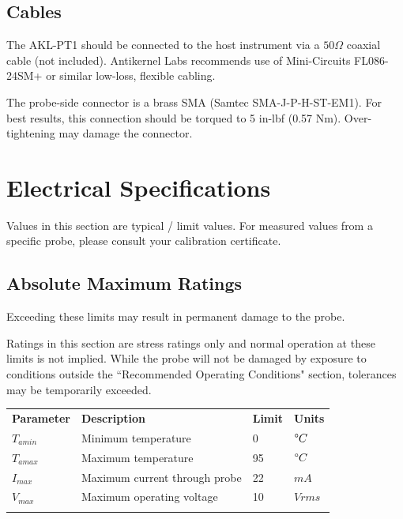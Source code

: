 \documentclass[11pt]{article}
\newcommand{\thinhline}{\Xhline{1\arrayrulewidth}}
\newcommand{\thickhline}{\Xhline{2.5\arrayrulewidth}}
\begin{document}
\subsection{Cables}

The AKL-PT1 should be connected to the host instrument via a $50 \Omega$ coaxial cable (not included). Antikernel Labs
recommends use of Mini-Circuits FL086-24SM+ or similar low-loss, flexible cabling.

The probe-side connector is a brass SMA (Samtec SMA-J-P-H-ST-EM1). For best results, this connection should be torqued
to 5 in-lbf (0.57 Nm). Over-tightening may damage the connector.

\pagebreak
\section{Electrical Specifications}

Values in this section are typical / limit values. For measured values from a specific probe, please consult your
calibration certificate.


\subsection{Absolute Maximum Ratings}

Exceeding these limits may result in permanent damage to the probe.

Ratings in this section are stress ratings only and normal operation at these limits is not implied. While the probe
will not be damaged by exposure to conditions outside the ``Recommended Operating Conditions" section, tolerances
may be temporarily exceeded.

\begin{tabularx}{16cm}{lXll}
\thickhline
\textbf{Parameter} & \textbf{Description} & \textbf{Limit} & \textbf{Units} \\
\thickhline
$T_{amin}$ & Minimum temperature & 0 & $ \degree C$ \\
\thinhline
$T_{amax}$ & Maximum temperature & 95 & $ \degree C$ \\
\thinhline
$I_{max}$ & Maximum current through probe & 22 & $ mA $ \\
\thinhline
$V_{max}$ & Maximum operating voltage & 10 & $ Vrms $ \\
\thickhline
\end{tabularx}
\end{document}
